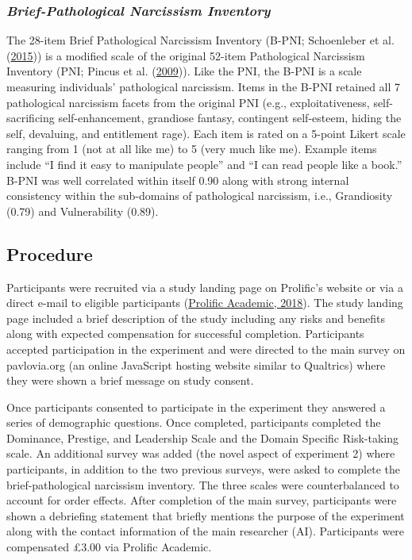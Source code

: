 \documentclass[
  donotrepeattitle,doc, 12pt, a4paper,floatsintext]{apa7}
\begin{document}
\hypertarget{brief-pathological-narcissism-inventory-1}{%
\subsubsection{\texorpdfstring{\emph{Brief-Pathological Narcissism Inventory}}{Brief-Pathological Narcissism Inventory}}\label{brief-pathological-narcissism-inventory-1}}

The 28-item Brief Pathological Narcissism Inventory (B-PNI; Schoenleber et al. (\protect\hyperlink{ref-schoenleber2015}{2015})) is a modified scale of the original 52-item Pathological Narcissism Inventory (PNI; Pincus et al. (\protect\hyperlink{ref-pincus2009}{2009})). Like the PNI, the B-PNI is a scale measuring individuals' pathological narcissism. Items in the B-PNI retained all 7 pathological narcissism facets from the original PNI (e.g., exploitativeness, self-sacrificing self-enhancement, grandiose fantasy, contingent self-esteem, hiding the self, devaluing, and entitlement rage). Each item is rated on a 5-point Likert scale ranging from 1 (not at all like me) to 5 (very much like me). Example items include ``I find it easy to manipulate people'' and ``I can read people like a book.'' B-PNI was well correlated within itself 0.90 along with strong internal consistency within the sub-domains of pathological narcissism, i.e., Grandiosity (0.79) and Vulnerability (0.89).

\hypertarget{procedure-4}{%
\subsection{Procedure}\label{procedure-4}}

Participants were recruited via a study landing page on Prolific's website or via a direct e-mail to eligible participants (\protect\hyperlink{ref-prolificacademic2018}{Prolific Academic, 2018}). The study landing page included a brief description of the study including any risks and benefits along with expected compensation for successful completion. Participants accepted participation in the experiment and were directed to the main survey on pavlovia.org (an online JavaScript hosting website similar to Qualtrics) where they were shown a brief message on study consent.

Once participants consented to participate in the experiment they answered a series of demographic questions. Once completed, participants completed the Dominance, Prestige, and Leadership Scale and the Domain Specific Risk-taking scale. An additional survey was added (the novel aspect of experiment 2) where participants, in addition to the two previous surveys, were asked to complete the brief-pathological narcissism inventory. The three scales were counterbalanced to account for order effects. After completion of the main survey, participants were shown a debriefing statement that briefly mentions the purpose of the experiment along with the contact information of the main researcher (AI). Participants were compensated £3.00 via Prolific Academic.
\end{document}
